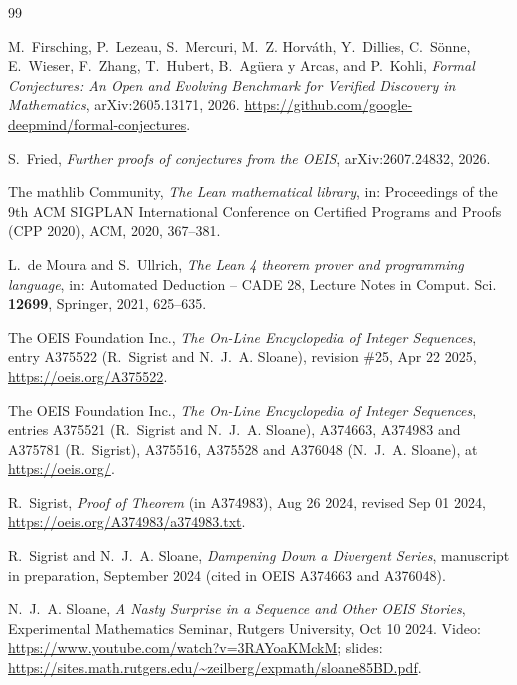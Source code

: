 \documentclass[11pt]{amsart}
\theoremstyle{plain}
\theoremstyle{definition}
\begin{document}
\begin{thebibliography}{99}

M.~Firsching, P.~Lezeau, S.~Mercuri, M.~Z. Horv\'ath, Y.~Dillies, C.~S\"onne, E.~Wieser, F.~Zhang, T.~Hubert, B.~Ag\"uera y Arcas, and P.~Kohli, \emph{Formal Conjectures: An Open and Evolving Benchmark for Verified Discovery in Mathematics}, arXiv:2605.13171, 2026. \url{https://github.com/google-deepmind/formal-conjectures}.

S.~Fried, \emph{Further proofs of conjectures from the OEIS}, arXiv:2607.24832, 2026.

The mathlib Community, \emph{The Lean mathematical library}, in: Proceedings of the 9th ACM SIGPLAN International Conference on Certified Programs and Proofs (CPP 2020), ACM, 2020, 367--381.

L.~de Moura and S.~Ullrich, \emph{The Lean 4 theorem prover and programming language}, in: Automated Deduction -- CADE 28, Lecture Notes in Comput. Sci. \textbf{12699}, Springer, 2021, 625--635.

The OEIS Foundation Inc., \emph{The On-Line Encyclopedia of Integer Sequences}, entry A375522 (R.~Sigrist and N.~J.~A. Sloane), revision \#25, Apr 22 2025, \url{https://oeis.org/A375522}.

The OEIS Foundation Inc., \emph{The On-Line Encyclopedia of Integer Sequences}, entries A375521 (R.~Sigrist and N.~J.~A. Sloane), A374663, A374983 and A375781 (R.~Sigrist), A375516, A375528 and A376048 (N.~J.~A. Sloane), at \url{https://oeis.org/}.

R.~Sigrist, \emph{Proof of Theorem} (in A374983), Aug 26 2024, revised Sep 01 2024, \url{https://oeis.org/A374983/a374983.txt}.

R.~Sigrist and N.~J.~A. Sloane, \emph{Dampening Down a Divergent Series}, manuscript in preparation, September 2024 (cited in OEIS A374663 and A376048).

N.~J.~A. Sloane, \emph{A Nasty Surprise in a Sequence and Other OEIS Stories}, Experimental Mathematics Seminar, Rutgers University, Oct 10 2024. Video: \url{https://www.youtube.com/watch?v=3RAYoaKMckM}; slides: \url{https://sites.math.rutgers.edu/~zeilberg/expmath/sloane85BD.pdf}.

\end{thebibliography}
\end{document}
